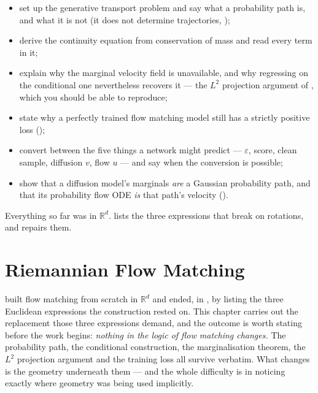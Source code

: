 \documentclass[11pt,a4paper]{report}
\theoremstyle{definition}
\theoremstyle{remark}
\newcommand{\RR}{\mathbb R}
\begin{document}
\begin{itemize}[nosep]
\item set up the generative transport problem and say what a probability path is, and what it is not (it does not determine trajectories, );
\item derive the continuity equation from conservation of mass and read every term in it;
\item explain why the marginal velocity field is unavailable, and why regressing on the conditional one nevertheless recovers it --- the $L^2$ projection argument of , which you should be able to reproduce;
\item state why a perfectly trained flow matching model still has a strictly positive loss ();
\item convert between the five things a network might predict --- $\varepsilon$, score, clean sample, diffusion $v$, flow $u$ --- and say when the conversion is possible;
\item show that a diffusion model's marginals \emph{are} a Gaussian probability path, and that its probability flow ODE \emph{is} that path's velocity ().
\end{itemize}

Everything so far was in $\RR^d$.  lists the three expressions that break on rotations, and  repairs them.

\clearpage

\chapter{Riemannian Flow Matching}
\label{chap:riemannian-fm}

 built flow matching from scratch in $\RR^d$ and
ended, in , by listing the three Euclidean
expressions the construction rested on. This chapter carries out the
replacement those three expressions demand, and the outcome is worth stating
before the work begins: \emph{nothing in the logic of flow matching changes.}
The probability path, the conditional construction, the marginalisation
theorem, the $L^2$ projection argument and the training loss all survive
verbatim. What changes is the geometry underneath them --- and the whole
difficulty is in noticing exactly where geometry was being used implicitly.
\end{document}
